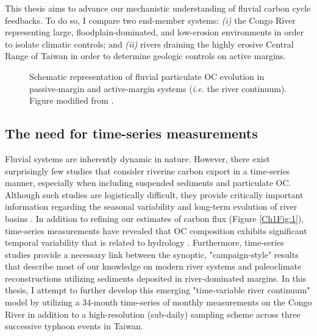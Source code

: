 This thesis aims to advance our mechanistic understanding of fluvial carbon cycle feedbacks. To do so, I compare two end-member systems: \textit{(i)} the Congo River representing large, floodplain-dominated, and low-erosion environments in order to isolate climatic controls; and \textit{(ii)} rivers draining the highly erosive Central Range of Taiwan in order to determine geologic controls on active margins.

\begin{figure}[t]
	\caption[Schematic representation of the river continuum]{Schematic representation of fluvial particulate OC evolution in passive-margin and active-margin systems (\textit{i.e.} the river continuum). Figure modified from \citet{Blair:2012du}.}
	\label{Ch1Fig:3} 
\end{figure}

\subsection{The need for time-series measurements}

Fluvial systems are inherently dynamic in nature. However, there exist surprisingly few studies that consider riverine carbon export in a time-series manner, especially when including suspended sediments and particulate OC. Although such studies are logistically difficult, they provide critically important information regarding the seasonal variability and long-term evolution of river basins \citep[\textit{e.g.}][]{Peterson:2002hj,Raymond:2003fd,Milliman:2011ug,Voss:2015dd}. In addition to refining our estimates of carbon flux (Figure \ref{Ch1Fig:1}), time-series measurements have revealed that OC composition exhibits significant temporal variability that is related to hydrology \citep{Voss:2015dd,Hemingway:2016bq}. Furthermore, time-series studies provide a necessary link between the synoptic, "campaign-style" results that describe most of our knowledge on modern river systems and paleoclimate reconstructions utilizing sediments deposited in river-dominated margins. In this thesis, I attempt to further develop this emerging "time-variable river continuum" model by utilizing a 34-month time-series of monthly measurements on the Congo River in addition to a high-resolution (sub-daily) sampling scheme across three successive typhoon events in Taiwan. 

